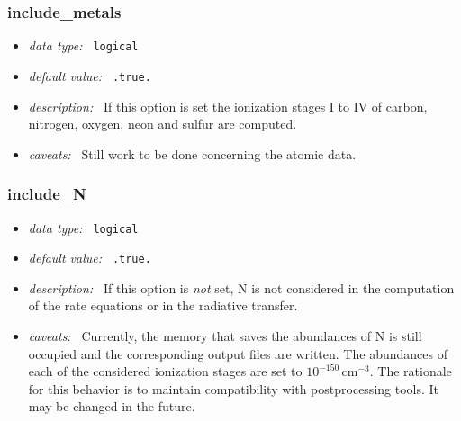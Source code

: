\documentclass[a4paper,10pt]{article}
\begin{document}
\subsubsection{include\_metals}
\label{opt:includemetals}
\begin{itemize}
 \item \textit{data type:~} \texttt{logical}
 \item \textit{default value:~} \texttt{.true.}
 \item \textit{description:~} If this option is set the ionization stages 
  I to IV of carbon, nitrogen, oxygen, neon and sulfur are computed.
 \item \textit{caveats:~} Still work to be done concerning the atomic data.
\end{itemize}


\subsubsection{include\_N}
\label{opt:includen}
\begin{itemize}
 \item \textit{data type:~} \texttt{logical}
 \item \textit{default value:~} \texttt{.true.}
 \item \textit{description:~} If this option is 
 \textit{not} set, N is not considered 
 in the computation of the rate equations or in the
 radiative transfer. 
 \item \textit{caveats:~} Currently, the memory that saves the 
 abundances of N is still occupied and the corresponding output
 files are written. The abundances of each of the considered ionization
 stages are set to $10^{-150}\,\mathrm{cm^{-3}}$. The rationale for
 this behavior is to maintain compatibility with postprocessing
 tools. It may be changed in the future.
\end{itemize}
\end{document}
